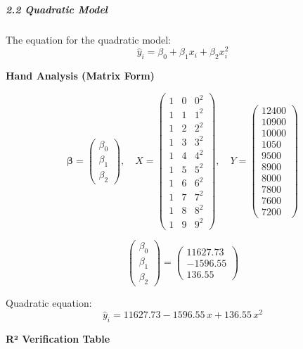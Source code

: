 \documentclass[12pt,a4paper]{article}
\begin{document}
\subparagraph{2.2 Quadratic Model}

The equation for the quadratic model:
\begin{equation}
  \hat{y}_i = \beta_0 + \beta_1 x_i + \beta_2 x_i^2
\end{equation}

\textbf{Hand Analysis (Matrix Form)}

\[
\bm{\beta} = \begin{pmatrix}\beta_0\\\beta_1\\\beta_2\end{pmatrix},\quad
X = \begin{pmatrix}1&0&0^2\\1&1&1^2\\1&2&2^2\\1&3&3^2\\1&4&4^2\\1&5&5^2\\1&6&6^2\\1&7&7^2\\1&8&8^2\\1&9&9^2\end{pmatrix},\quad
Y = \begin{pmatrix}12400\\10900\\10000\\1050\\9500\\8900\\8000\\7800\\7600\\7200\end{pmatrix}
\]

\[
\begin{pmatrix}\beta_0\\\beta_1\\\beta_2\end{pmatrix} = \begin{pmatrix}11627.73\\-1596.55\\136.55\end{pmatrix}
\]

Quadratic equation:
\begin{equation}
  \hat{y}_i = 11627.73 - 1596.55\,x + 136.55\,x^2
\end{equation}

\textbf{R² Verification Table}
\end{document}
